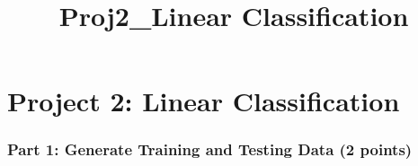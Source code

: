 \documentclass[11pt]{article}
\title{Proj2\_Linear Classification}
\begin{document}
    
    
    \maketitle
    
    

    
    \hypertarget{project-2-linear-classification}{%
\section{Project 2: Linear
Classification}\label{project-2-linear-classification}}

    \hypertarget{part-1-generate-training-and-testing-data-2-points}{%
\subsubsection{Part 1: Generate Training and Testing Data (2
points)}\label{part-1-generate-training-and-testing-data-2-points}}
\end{document}
